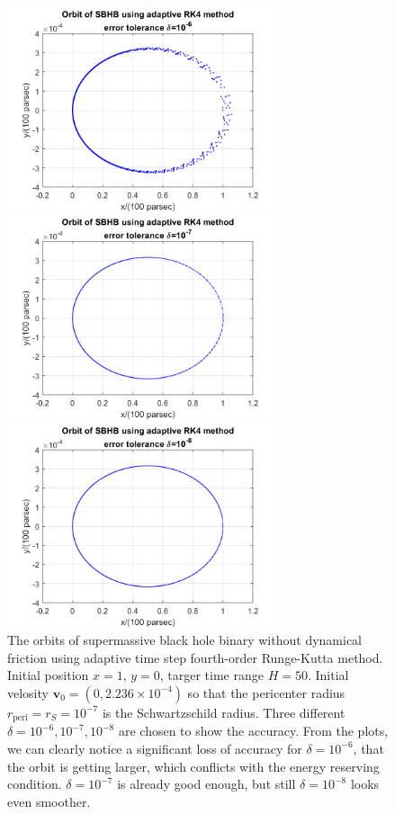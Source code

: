 \documentclass[12pt, graphicx]{article}
\begin{document}
\begin{figure}[ht]
\begin{minipage}{0.48\linewidth}
\centering
\includegraphics[width = 80mm]{BH_a6.png}
\end{minipage}
\begin{minipage}{0.48\linewidth}
\centering
\includegraphics[width = 80mm]{BH_a7.png}
\end{minipage}
\centering
\begin{minipage}{0.48\linewidth}
\centering
\includegraphics[width = 80mm]{BH_a8.png}
\end{minipage}
\caption{The orbits of supermassive black hole binary without dynamical friction using adaptive time step fourth-order Runge-Kutta method. Initial position $x=1$, $y=0$, targer time range $H=50$. Initial velosity $\mathbf{v}_0=(0,2.236\times10^{-4})$ so that the pericenter radius $r_\mathrm{peri}=r_S=10^{-7}$ is the Schwartzschild radius. Three different  $\delta=10^{-6}, 10^{-7}, 10^{-8}$ are chosen to show the accuracy. From the plots, we can clearly notice a significant loss of accuracy for $\delta=10^{-6}$, that the orbit is getting larger, which conflicts with the energy reserving condition. $\delta=10^{-7}$ is already good enough, but still $\delta=10^{-8}$ looks even smoother. }
\label{fig:BHa}
\end{figure}
\end{document}
